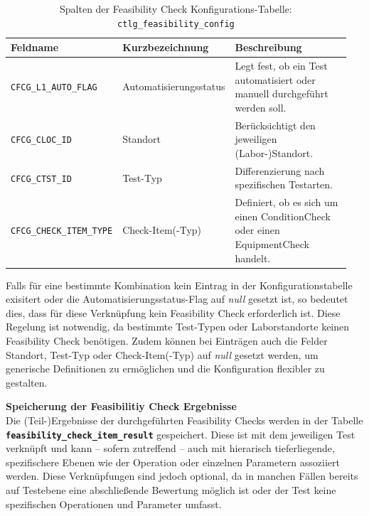 \begin{table}[htbp]
    \centering
    \caption{Spalten der Feasibility Check Konfigurations-Tabelle: \texttt{ctlg\_feasibility\_config}}
    \footnotesize
    \renewcommand{\arraystretch}{1.2}
    \begin{tabular}{p{0.3\linewidth} p{0.3\linewidth} p{0.35\linewidth}}
        \toprule
        \textbf{Feldname} & \textbf{Kurzbezeichnung} & \textbf{Beschreibung} \\
        \midrule
        \texttt{CFCG\_L1\_AUTO\_FLAG} & Automatisierungsstatus & Legt fest, ob ein Test automatisiert oder manuell durchgeführt werden soll. \\
        \midrule
        \texttt{CFCG\_CLOC\_ID} & Standort & Berücksichtigt den jeweiligen (Labor-)Standort. \\
        \midrule
        \texttt{CFCG\_CTST\_ID} & Test-Typ & Differenzierung nach spezifischen Testarten. \\
        \midrule
        \texttt{CFCG\_CHECK\_ITEM\_TYPE} & Check-Item(-Typ) & Definiert, ob es sich um einen \gls{ConditionCheck} oder einen \gls{EquipmentCheck} handelt. \\
        \bottomrule
    \end{tabular}
    \label{tab:config-fields}
\end{table}

Falls für eine bestimmte Kombination kein Eintrag in der Konfigurationstabelle exisitert oder die Automatisierungsstatus-Flag auf \textit{null} gesetzt  ist, so bedeutet dies, dass für diese Verknüpfung kein Feasibility Check erforderlich ist. Diese Regelung ist notwendig, da bestimmte Test-Typen oder Laborstandorte keinen Feasibility Check benötigen. Zudem können bei Einträgen auch die Felder Standort, Test-Typ oder Check-Item(-Typ) auf \textit{null} gesetzt werden, um generische Definitionen zu ermöglichen und die Konfiguration flexibler zu gestalten.

\textbf{Speicherung der Feasibilitiy Check Ergebnisse} \\
Die (Teil-)Ergebnisse der durchgeführten Feasibility Checks werden in der Tabelle \textbf{\texttt{feasibility\_check\_item\_result}} gespeichert. Diese ist mit dem jeweiligen Test verknüpft und kann – sofern zutreffend – auch mit hierarisch tieferliegende, spezifischere Ebenen wie der Operation oder einzelnen Parametern assoziiert werden. Diese Verknüpfungen sind jedoch optional, da in manchen Fällen bereits auf Testebene eine abschließende Bewertung möglich ist oder der Test keine spezifischen Operationen und Parameter umfasst.


